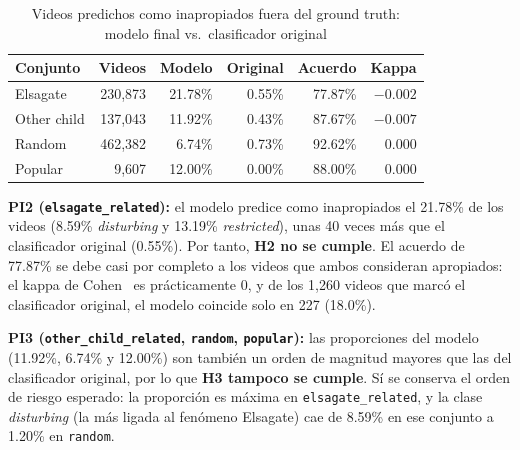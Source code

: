 \documentclass[conference]{IEEEtran}
\begin{document}
\begin{table}[!t]
\caption{Videos predichos como inapropiados fuera del ground truth: modelo final vs.\ clasificador original}
\begin{center}
\footnotesize
\setlength{\tabcolsep}{2.5pt}
\begin{tabular}{|l|r|r|r|r|r|}
\hline
\textbf{Conjunto} & \textbf{Videos} & \textbf{Modelo} & \textbf{Original} & \textbf{Acuerdo} & \textbf{Kappa} \\
\hline
Elsagate & 230,873 & 21.78\% & 0.55\% & 77.87\% & $-0.002$ \\
\hline
Other child & 137,043 & 11.92\% & 0.43\% & 87.67\% & $-0.007$ \\
\hline
Random & 462,382 & 6.74\% & 0.73\% & 92.62\% & 0.000 \\
\hline
Popular & 9,607 & 12.00\% & 0.00\% & 88.00\% & 0.000 \\
\hline
\end{tabular}
\label{tab:consist}
\end{center}
\end{table}

\textbf{PI2 (\texttt{elsagate\_related}):} el modelo predice como inapropiados el 21.78\% de los videos (8.59\% \textit{disturbing} y 13.19\% \textit{restricted}), unas 40 veces más que el clasificador original (0.55\%). Por tanto, \textbf{H2 no se cumple}. El acuerdo de 77.87\% se debe casi por completo a los videos que ambos consideran apropiados: el kappa de Cohen~\cite{cohen} es prácticamente 0, y de los 1,260 videos que marcó el clasificador original, el modelo coincide solo en 227 (18.0\%).

\textbf{PI3 (\texttt{other\_child\_related}, \texttt{random}, \texttt{popular}):} las proporciones del modelo (11.92\%, 6.74\% y 12.00\%) son también un orden de magnitud mayores que las del clasificador original, por lo que \textbf{H3 tampoco se cumple}. Sí se conserva el orden de riesgo esperado: la proporción es máxima en \texttt{elsagate\_related}, y la clase \textit{disturbing} (la más ligada al fenómeno Elsagate) cae de 8.59\% en ese conjunto a 1.20\% en \texttt{random}.
\end{document}
